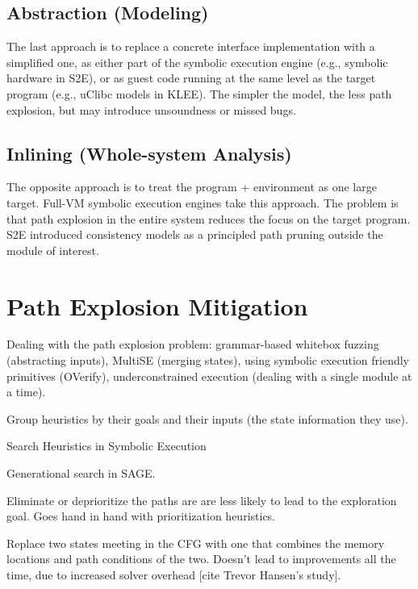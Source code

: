 \subsection{Abstraction (Modeling)}

The last approach is to replace a concrete interface implementation with a simplified one, as either part of the symbolic execution engine (e.g., symbolic hardware in S2E), or as guest code running at the same level as the target program (e.g., uClibc models in KLEE).  The simpler the model, the less path explosion, but may introduce unsoundness or missed bugs.

\subsection{Inlining (Whole-system Analysis)}

The opposite approach is to treat the program + environment as one large target.  Full-VM symbolic execution engines take this approach.  The problem is that path explosion in the entire system reduces the focus on the target program.  S2E introduced consistency models as a principled path pruning outside the module of interest.


\iffalse
\section{Path Explosion Mitigation}
\label{sec:relwork:pathexpl}

Dealing with the path explosion problem: grammar-based whitebox fuzzing (abstracting inputs), MultiSE (merging states), using symbolic execution friendly primitives (OVerify), underconstrained execution (dealing with a single module at a time).

Group heuristics by their goals and their inputs (the state information they use).

Search Heuristics in Symbolic Execution

Generational search in SAGE.

Eliminate or deprioritize the paths are are less likely to lead to the exploration goal.  Goes hand in hand with prioritization heuristics.

Replace two states meeting in the CFG with one that combines the memory locations and path conditions of the two.  Doesn't lead to improvements all the time, due to increased solver overhead [cite Trevor Hansen's study].

